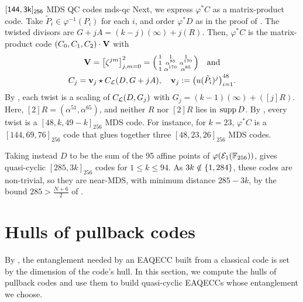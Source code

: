 \documentclass[twocolumn, 11pt]{scrartcl}
\begin{document}
\begin{example}{$\sf{[144,3k]_{256}}$ MDS\hspace{-1pt} QC\hspace{-1pt} codes \cite{code-f256}}{mds-qc}
Next, we express $\varphi^*C$ as a matrix-product code. Take $\tilde P_i\in\varphi^{-1}(P_i)$ for each $i$, and order $\varphi^*D$ as in the proof of . The twisted divisors are $G+jA=(k-j)(\infty)+j(R)$. Then, $\varphi^*C$ is the matrix-product code $(C_0,C_1,C_2)\cdot\bfV$ with
\begin{gather*}
    \bfV=\br*{\zeta^{jm}}_{j,m=0}^2=\begin{psmallmatrix}
1&1&1 \\
1&\alpha^{85}&\alpha^{170} \\
1&\alpha^{170}&\alpha^{85}
\end{psmallmatrix}\quad\text{and} \\
C_j=\bfv_j\star C_\mcL(D,G+jA),\quad \bfv_j:=\pa*{u(\tilde P_i)^j}_{i=1}^{48}.
\end{gather*}
By , each twist is a scaling of $C_\mcL(D,G_j)$ with $G_j=(k-1)(\infty)+([j]R)$. Here, $[2]R=(\alpha^{51},\alpha^{65})$, and neither $R$ nor $[2]R$ lies in $\supp D$. By , every twist is a $[48,k,49-k]_{256}$ MDS code. For instance, for $k=23$, $\varphi^*C$ is a $[144,69,76]_{256}$ code that glues together three $[48,23,26]_{256}$ MDS codes.
 
Taking instead $D$ to be the sum of the 95 affine points of $\varphi(\mcE_1(\bbF_{256}))$,  gives quasi-cyclic $[285,3k]_{256}$ codes for $1\leq k\leq94$. As $3k\notin\set{1,284}$, these codes are non-trivial, so they are near-MDS, with minimum distance $285-3k$, by the bound $285>\frac{N+6}2$ of \cite[Thm.~1.2]{han2024maximal}.
\end{example}

\section{Hulls of pullback codes} \label{section:hulls}

By , the entanglement needed by an EAQECC built from a classical code is set by the dimension of the code's hull. In this section, we compute the hulls of pullback codes and use them to build quasi-cyclic EAQECCs whose entanglement we choose.
\end{document}

